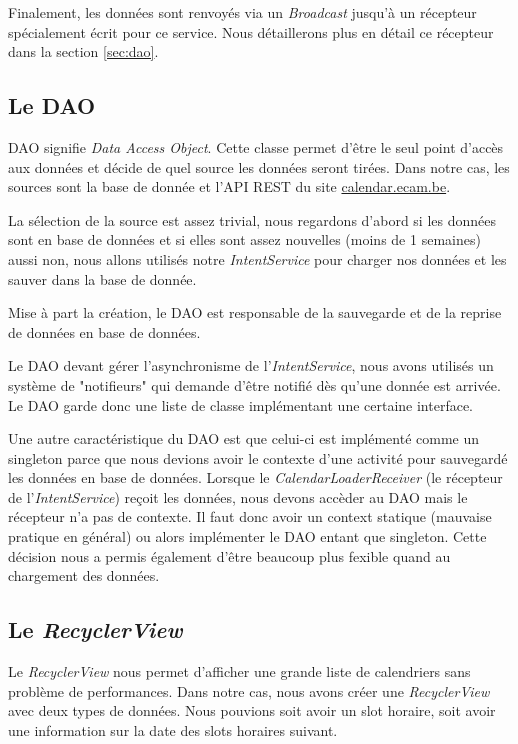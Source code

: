 \documentclass{article}
\begin{document}
            Finalement, les données sont renvoyés via un \textit{Broadcast} jusqu'à un récepteur
            spécialement écrit pour ce service. Nous détaillerons plus en détail ce récepteur dans
            la section \ref{sec:dao}.

        \label{sec:dao}
        \subsection{Le DAO}
            DAO signifie \textit{Data Access Object}. Cette classe permet d'être le seul point
            d'accès aux données et décide de quel source les données seront tirées. Dans notre cas,
            les sources sont la base de donnée et l'API REST du site \url{calendar.ecam.be}.

            La sélection de la source est assez trivial, nous regardons d'abord si les données sont
            en base de données et si elles sont assez nouvelles (moins de 1 semaines) aussi non,
            nous allons utilisés notre \textit{IntentService} pour charger nos données et les sauver
            dans la base de donnée.

            Mise à part la création, le DAO est responsable de la sauvegarde et de la reprise de
            données en base de données.

            Le DAO devant gérer l'asynchronisme de l'\textit{IntentService}, nous avons utilisés un
            système de "notifieurs" qui demande d'être notifié dès qu'une donnée est arrivée. Le DAO
            garde donc une liste de classe implémentant une certaine interface.

            Une autre caractéristique du DAO est que celui-ci est implémenté comme un singleton
            parce que nous devions avoir le contexte d'une activité pour sauvegardé les données en
            base de données. Lorsque le \textit{CalendarLoaderReceiver} (le récepteur de
            l'\textit{IntentService}) reçoit les données, nous devons accèder au DAO mais le
            récepteur n'a pas de contexte. Il faut donc avoir un context statique (mauvaise pratique
            en général) ou alors implémenter le DAO entant que singleton. Cette décision nous a
            permis également d'être beaucoup plus fexible quand au chargement des données.

        \subsection{Le \textit{RecyclerView}}
            Le \textit{RecyclerView} nous permet d'afficher une grande liste de calendriers sans
            problème de performances. Dans notre cas, nous avons créer une \textit{RecyclerView}
            avec deux types de données. Nous pouvions soit avoir un slot horaire, soit avoir une
            information sur la date des slots horaires suivant.
\end{document}
